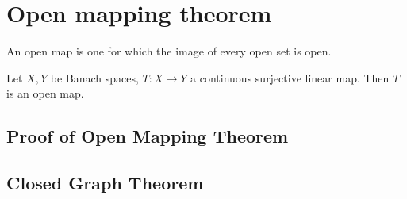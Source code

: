 \newpage
\section{Open mapping theorem}
\begin{definition}\label{open map}\nl
	An open map is one for which the image of every open set is open.
\end{definition}
\begin{theorem}\label{OMT}\nl
	Let $X,Y$ be Banach spaces, $T:X\xrightarrow{}Y$ a continuous surjective linear map. Then $T$ is an open map.
\end{theorem}

\begin{proposition}\label{Equinorm}
	
\end{proposition}
\subsection{Proof of Open Mapping Theorem}
\placeholder
\subsection{Closed Graph Theorem}

\begin{definition}[Graph]\nl
	\placeholder
\end{definition}

\begin{theorem}\label{CGT}\nl
	\placeholder
\end{theorem}

\begin{definition}\label{Closed Operator}\nl
	\placeholder
\end{definition}
